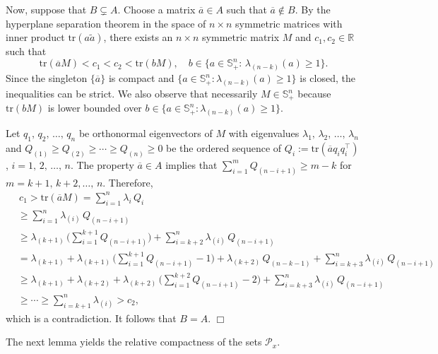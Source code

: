 \documentclass[11pt]{amsart}
\numberwithin{equation}{section}
\newcommand{\ep}{\hfill $\Box$}
\begin{document}
Now, suppose that $B \subsetneq A$. Choose a matrix $\overline{a} \in A$ such that $\overline{a} \notin B$. By the hyperplane separation theorem in the space of $n\times n$ symmetric matrices with inner product $\text{tr}(a\widetilde{a})$, there exists an $n\times n$ symmetric matrix $M$ and $c_1, c_2 \in \mathbb{R}$ such that
\begin{equation}
\text{tr}(\overline{a}M) < c_1 < c_2 < \text{tr}(bM),\quad 
b\in \{a \in \mathbb{S}_+^n:\, \lambda_{(n-k)}(a)\geq 1\}.
\end{equation}
Since the singleton $\{\overline{a}\}$ is compact and $\{a \in \mathbb{S}_+^n \!: \lambda_{(n-k)}(a)\geq 1\}$ is closed, the inequalities can be strict. We also observe that necessarily $M\in\mathbb{S}^n_+$ because $\text{tr}(bM)$ is lower bounded over $b \in \{a \in \mathbb{S}_+^n \!: \lambda_{(n-k)}(a)\geq 1\}$.
	
\medskip
	
Let $q_1,\,q_2,\,\ldots,\,q_n$ be orthonormal eigenvectors of $M$ with eigenvalues $\lambda_1,\,\lambda_2,\,\ldots,\,\lambda_n$ and $Q_{(1)} \ge Q_{(2)}\ge\cdots \ge Q_{(n)} \geq 0$ be the ordered sequence of $Q_i := \mathrm{tr}(\overline{a}q_i q_i^{\top})$, $i=1,\,2,\,\ldots,\,n$. The property $\overline{a}\in A$ implies that $\sum_{i=1}^m Q_{(n-i+1)} \geq m-k$ for $m = k+1,\,k+2, \ldots,\, n$. Therefore,
\begin{equation}
\begin{split}
& \, c_1 > \text{tr}(\overline{a}M) 
= \sum_{i=1}^n \lambda_i\,Q_i \\
& \geq \sum_{i=1}^n \lambda_{(i)}\,Q_{(n-i+1)} \\
&\geq \lambda_{(k+1)}\,\bigg( \sum_{i=1}^{k+1} Q_{(n-i+1)} \bigg) 
+ \sum_{i=k+2}^n \lambda_{(i)}\,Q_{(n-i+1)} \\
&= \lambda_{(k+1)} + \lambda_{(k+1)}\,\bigg( \sum_{i=1}^{k+1} Q_{(n-i+1)} - 1 \bigg) + \lambda_{(k+2)}\,Q_{(n-k-1)} + \sum_{i=k+3}^n \lambda_{(i)}\,Q_{(n-i+1)} \\
&\geq \lambda_{(k+1)} + \lambda_{(k+2)} + \lambda_{(k+2)}\,\bigg( \sum_{i=1}^{k+2} Q_{(n-i+1)} - 2 \bigg) + \sum_{i=k+3}^n \lambda_{(i)}\,Q_{(n-i+1)} \\
&\geq \cdots \geq \sum_{i=k+1}^n \lambda_{(i)} > c_2,
\end{split}
\end{equation}
which is a contradiction. It follows that $B=A$. \ep

\medskip

The next lemma yields the relative compactness of the sets $\mathcal{P}_x$.
\end{document}
